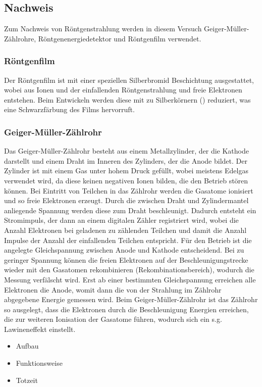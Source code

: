 \documentclass[10pt, a4paper]{article}
\begin{document}
\subsection{Nachweis}
\label{sec:nachweis}
Zum Nachweis von Röntgenstrahlung werden in diesem Versuch Geiger-Müller-Zählrohre, Röntgenenergiedetektor und Röntgenfilm verwendet.

\subsubsection{Röntgenfilm}
Der Röntgenfilm ist mit einer speziellen Silberbromid Beschichtung ausgestattet, wobei aus  Ionen und der einfallenden Röntgenstrahlung  und freie Elektronen entstehen.
Beim Entwickeln werden diese mit  zu Silberkörnern () reduziert, was eine Schwarzfärbung des Films hervorruft.

\subsubsection{Geiger-Müller-Zählrohr}
Das Geiger-Müller-Zählrohr besteht aus einem Metallzylinder, der die Kathode darstellt und einem Draht im Inneren des Zylinders, der die Anode bildet.
Der Zylinder ist mit einem Gas unter hohem Druck gefüllt, wobei meistens Edelgas verwendet wird, da diese keinen negativen Ionen bilden, die den Betrieb stören können.
Bei Eintritt von Teilchen in das Zählrohr werden die Gasatome ionisiert und so freie Elektronen erzeugt.
Durch die zwischen Draht und Zylindermantel anliegende Spannung werden diese zum Draht beschleunigt.
Dadurch entsteht ein Stromimpuls, der dann an einem digitalen Zähler registriert wird, wobei die Anzahl Elektronen bei geladenen zu zählenden Teilchen und damit die Anzahl Impulse der Anzahl der einfallenden Teilchen entspricht.
Für den Betrieb ist die angelegte Gleichspannung zwischen Anode und Kathode entscheidend.
Bei zu geringer Spannung können die freien Elektronen auf der Beschleunigungstrecke wieder mit den Gasatomen rekombinieren (Rekombinationsbereich), wodurch die Messung verfälscht wird.
Erst ab einer bestimmten Gleichspannung erreichen alle Elektronen die Anode, womit dann die von der Strahlung im Zählrohr abgegebene Energie gemessen wird.
Beim Geiger-Müller-Zählrohr ist das Zählrohr so ausgelegt, dass die Elektronen durch die Beschleunigung Energien erreichen, die zur weiteren Ionisation der Gasatome führen, wodurch sich ein s.g. Lawineneffekt einstellt.

\begin{itemize}
  \item Aufbau
  \item Funktionsweise
  \item Totzeit
\end{itemize}
\end{document}
